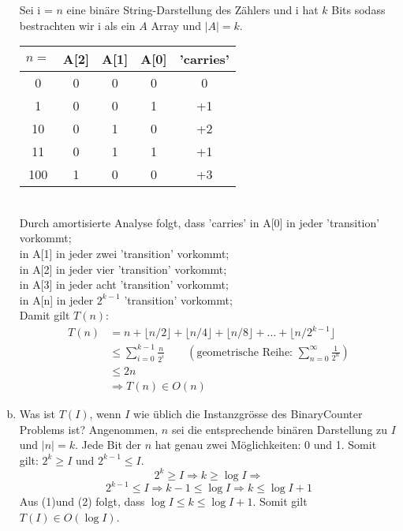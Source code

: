 \documentclass{article}
\begin{document}
\begin{flushleft}
\begin{enumerate}[(a)]
    \newline
    Sei i = $n$ eine binäre String-Darstellung des Zählers und i hat $k$ Bits sodass bestrachten wir i als ein $A$ Array und $|A| = k$.
    \newline \\
    \begin{tabular}{||c|c|c|c|c||}
        \hline $n=$ & A[2] & A[1] & A[0] & ’carries’ \\
        \hline 0 & 0 & 0 & 0 & 0 \\
        \hline 1 & 0 & 0 & 1 & +1 \\
        \hline 10 & 0 & 1 & 0 & +2 \\
        \hline 11 & 0 & 1 & 1 & +1 \\
        \hline 100 & 1 & 0 & 0 & +3 \\
        \hline
        \end{tabular}
    \newline \\
    Durch amortisierte Analyse folgt, dass ’carries’
    \newline
    in A[0] in jeder ’transition’ vorkommt; \\
    in A[1] in jeder zwei ’transition’ vorkommt; \\
    in A[2] in jeder vier ’transition’ vorkommt; \\
    in A[3] in jeder acht ’transition’ vorkommt; \\
    in A[n] in jeder $2^{k-1}$ ’transition’ vorkommt; \\
    Damit gilt $T(n)$: 
    \begin{equation*}
        \begin{aligned}
            T(n) &= n + \lfloor n/2 \rfloor + \lfloor n/4 \rfloor + \lfloor n/8 \rfloor + \dots + \lfloor n/2^{k-1} \rfloor \\
                 &\leq \sum_{i=0}^{k-1} \frac{n}{2^i} \qquad (\text{geometrische Reihe: }\sum_{n=0}^{\infty}\frac{1}{2^n}) \\
                 &\leq 2n \\
                 &\Longrightarrow T(n) \in O(n)
        \end{aligned}
    \end{equation*}
    \item Was ist $T(I)$, wenn $I$ wie üblich die Instanzgrösse des BinaryCounter Problems ist?
    \newline
    Angenommen, $n$ sei die entsprechende binären Darstellung zu $I$ und $|n| = k$. Jede Bit der $n$ hat genau
    zwei Möglichkeiten: 0 und 1. Somit gilt: $2^k \geq I$ und $2^{k-1} \leq I$.
    \begin{equation}
        2^k \geq I \Longrightarrow 
        k \geq \log I \Longrightarrow 
    \end{equation}
    \begin{equation}
        2^{k-1} \leq I \Longrightarrow k-1 \leq \log I \Longrightarrow 
        k \leq \log I + 1
    \end{equation}
    Aus (1)und (2) folgt, dass $\log I \leq k \leq \log I + 1$. Somit gilt $T(I) \in O(\log I)$.
\end{enumerate}
\end{flushleft}
\end{document}
